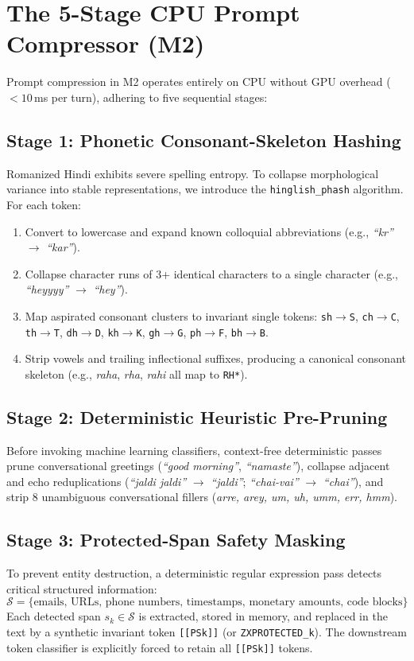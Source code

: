 \section{The 5-Stage CPU Prompt Compressor (M2)}
Prompt compression in M2 operates entirely on CPU without GPU overhead ($<10$\,ms per turn), adhering to five sequential stages:

\subsection{Stage 1: Phonetic Consonant-Skeleton Hashing}
Romanized Hindi exhibits severe spelling entropy. To collapse morphological variance into stable representations, we introduce the \texttt{hinglish\_phash} algorithm. For each token:
\begin{enumerate}
    \item Convert to lowercase and expand known colloquial abbreviations (e.g., \textit{``kr''} $\to$ \textit{``kar''}).
    \item Collapse character runs of 3+ identical characters to a single character (e.g., \textit{``heyyyy''} $\to$ \textit{``hey''}).
    \item Map aspirated consonant clusters to invariant single tokens: \texttt{sh}$\to$\texttt{S}, \texttt{ch}$\to$\texttt{C}, \texttt{th}$\to$\texttt{T}, \texttt{dh}$\to$\texttt{D}, \texttt{kh}$\to$\texttt{K}, \texttt{gh}$\to$\texttt{G}, \texttt{ph}$\to$\texttt{F}, \texttt{bh}$\to$\texttt{B}.
    \item Strip vowels and trailing inflectional suffixes, producing a canonical consonant skeleton (e.g., \textit{raha}, \textit{rha}, \textit{rahi} all map to \texttt{RH*}).
\end{enumerate}

\subsection{Stage 2: Deterministic Heuristic Pre-Pruning}
Before invoking machine learning classifiers, context-free deterministic passes prune conversational greetings (\textit{``good morning''}, \textit{``namaste''}), collapse adjacent and echo reduplications (\textit{``jaldi jaldi''} $\to$ \textit{``jaldi''}; \textit{``chai-vai''} $\to$ \textit{``chai''}), and strip 8 unambiguous conversational fillers (\textit{arre, arey, um, uh, umm, err, hmm}).

\subsection{Stage 3: Protected-Span Safety Masking}
To prevent entity destruction, a deterministic regular expression pass detects critical structured information:
\begin{equation}
    \mathcal{S} = \{ \text{emails, URLs, phone numbers, timestamps, monetary amounts, code blocks} \}
\end{equation}
Each detected span $s_k \in \mathcal{S}$ is extracted, stored in memory, and replaced in the text by a synthetic invariant token \texttt{[[PSk]]} (or \texttt{ZXPROTECTED\_k}). The downstream token classifier is explicitly forced to retain all \texttt{[[PSk]]} tokens.

